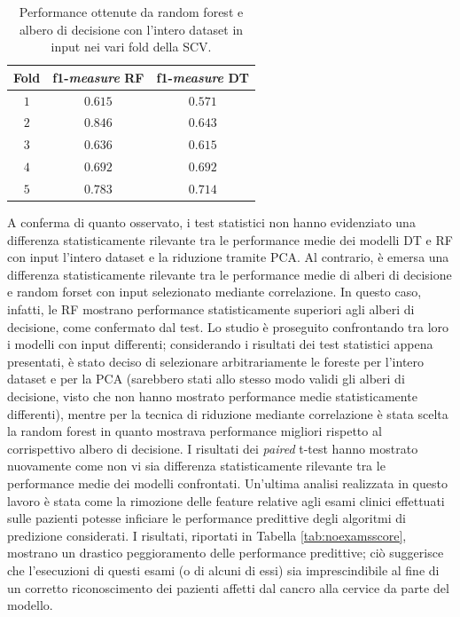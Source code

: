 \begin{table}
	\centering
	\caption{Performance ottenute da random forest e albero di decisione con l'intero dataset in input nei vari fold della SCV.}
	\label{tab:f1fold}
	\begin{tabular}{|c|c|c|}
		\hline 
		Fold & f1-\textit{measure} RF & f1-\textit{measure} DT \\ 
		\hline 
		$1$ & $0.615$  & $0.571$\\ 
		\hline 
		$2$ & $0.846$ & $0.643$\\ 
		\hline 
		$3$ & $0.636$ & $0.615$\\ 
		\hline 
		$4$ & $0.692$ & $0.692$\\ 
		\hline 
		$5$ & $0.783$ & $0.714$\\ 
		\hline 
	\end{tabular} 
\end{table}
A conferma di quanto osservato, i test statistici non hanno evidenziato una differenza statisticamente rilevante tra le performance medie dei modelli DT e RF con input l'intero dataset e la riduzione tramite PCA. Al contrario, è emersa una differenza statisticamente rilevante tra le performance medie di alberi di decisione e random forset con input selezionato mediante correlazione. In questo caso, infatti, le RF mostrano performance statisticamente superiori agli alberi di decisione, come confermato dal test.
Lo studio è proseguito confrontando tra loro i modelli con input differenti; considerando i risultati dei test statistici appena presentati, è stato deciso di selezionare arbitrariamente le foreste per l'intero dataset e per la PCA (sarebbero stati allo stesso modo validi gli alberi di decisione, visto che non hanno mostrato performance medie statisticamente differenti), mentre per la tecnica di riduzione mediante correlazione è stata scelta la random forest in quanto mostrava performance migliori rispetto al corrispettivo albero di decisione. I risultati dei \textit{paired} t-test hanno mostrato nuovamente come non vi sia differenza statisticamente rilevante tra le performance medie dei modelli confrontati.
Un'ultima analisi realizzata in questo lavoro è stata come la rimozione delle feature relative agli esami clinici effettuati sulle pazienti potesse inficiare le performance predittive degli algoritmi di predizione considerati. 
I risultati, riportati in Tabella \ref{tab:noexamsscore}, mostrano un drastico peggioramento delle performance predittive; ciò suggerisce che l'esecuzioni di questi esami (o di alcuni di essi) sia imprescindibile al fine di un corretto riconoscimento dei pazienti affetti dal cancro alla cervice da parte del modello. 
